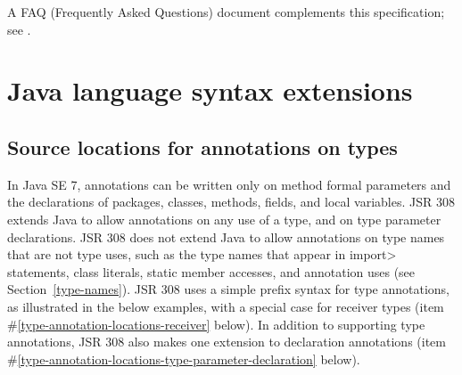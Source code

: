 \documentclass[10pt]{article}
\begin{document}
A FAQ (Frequently Asked Questions) document complements this specification;
see .



\section{Java language syntax extensions\label{syntax}}

\newcommand{\preverbnegspace}{\vspace{-5pt}}

\subsection{Source locations for annotations on types\label{type-annotation-locations}}

In Java SE 7, annotations can be written only on method formal parameters
and the declarations of packages, classes, methods, fields, and local variables.
JSR 308 extends Java to allow annotations on any use of a type, and
on type parameter declarations.  JSR 308 does not extend Java to allow
annotations on type names that are not type uses, such as the type names
that appear in \<import> statements, class literals, static member accesses,
and annotation uses (see Section~\ref{type-names}).
JSR 308 uses a simple prefix syntax for type annotations, as illustrated in
the below examples, with a special case
for receiver types (item \#\ref{type-annotation-locations-receiver} below).
In addition to supporting type annotations, JSR 308 also makes one
extension to declaration annotations (item
\#\ref{type-annotation-locations-type-parameter-declaration} below).
\end{document}
